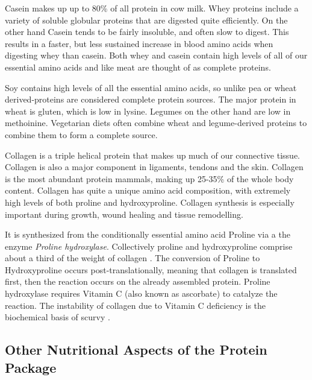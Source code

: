 \documentclass{tufte-handout}
\begin{document}
  Casein makes up up to 80\% of all protein in cow milk.  Whey proteins include a variety of soluble globular proteins that are digested quite efficiently.  On the other hand Casein tends to be fairly insoluble, and often slow to digest.  This results in a faster, but less sustained increase in blood amino acids when digesting whey than casein.   Both whey and casein contain high levels of all of our essential amino acids and like meat are thought of as complete proteins.

  Soy contains high levels of all the essential amino acids, so unlike pea or wheat derived-proteins are considered complete protein sources.  The major protein in wheat is gluten, which is low in lysine.  Legumes on the other hand are low in methoinine.  Vegetarian diets often combine wheat and legume-derived proteins to combine them to form a complete source.

Collagen is a triple helical protein that makes up much of our connective tissue.  Collagen is also a major component in ligaments, tendons and the skin.  Collagen is the most abundant protein mammals, making up 25-35\% of the whole body content.  Collagen has quite a unique amino acid composition, with extremely high levels of both proline and hydroxyproline.  Collagen synthesis is especially important during growth, wound healing and tissue remodelling.

  It is synthesized from the conditionally essential amino acid Proline via a the enzyme \emph{Proline hydroxylase}.  Collectively proline and hydroxyproline comprise about a third of the weight of collagen \citep{Bowes1948}.  The conversion of Proline to Hydroxyproline occurs post-translationally, meaning that collagen is translated first, then the reaction occurs on the already assembled protein.  Proline hydroxylase requires Vitamin C (also known as ascorbate) to catalyze the reaction.  The instability of collagen due to Vitamin C deficiency is the biochemical basis of scurvy \cite{Lind1753}. 

\subsection{Other Nutritional Aspects of the Protein Package}
\end{document}
